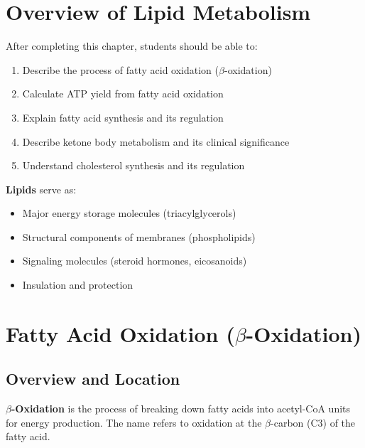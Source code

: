 \section{Overview of Lipid Metabolism}

\begin{learningobjectives}
After completing this chapter, students should be able to:
\begin{enumerate}
    \item Describe the process of fatty acid oxidation ($\beta$-oxidation)
    \item Calculate ATP yield from fatty acid oxidation
    \item Explain fatty acid synthesis and its regulation
    \item Describe ketone body metabolism and its clinical significance
    \item Understand cholesterol synthesis and its regulation
\end{enumerate}
\end{learningobjectives}

\begin{definition}
\textbf{Lipids} serve as:
\begin{itemize}
    \item Major energy storage molecules (triacylglycerols)
    \item Structural components of membranes (phospholipids)
    \item Signaling molecules (steroid hormones, eicosanoids)
    \item Insulation and protection
\end{itemize}
\end{definition}

\section{Fatty Acid Oxidation ($\beta$-Oxidation)}

\subsection{Overview and Location}

\begin{definition}
\textbf{$\beta$-Oxidation} is the process of breaking down fatty acids into acetyl-CoA units for energy production. The name refers to oxidation at the $\beta$-carbon (C3) of the fatty acid.
\end{definition}


